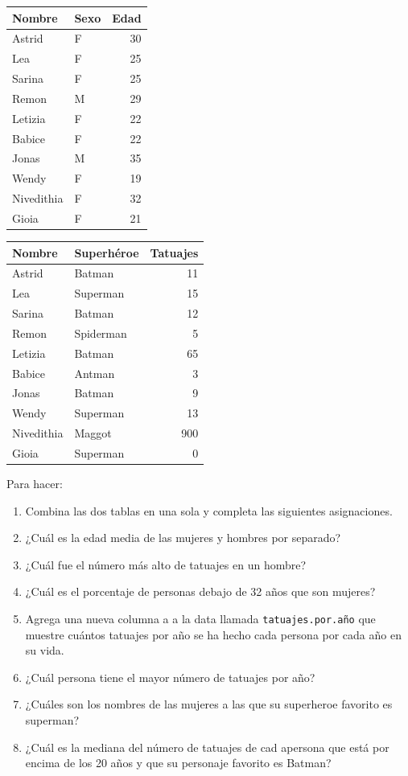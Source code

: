 \documentclass[
]{book}
\begin{document}
\begin{tabular}{l|l|r}
\hline
Nombre & Sexo & Edad\\
\hline
Astrid & F & 30\\
\hline
Lea & F & 25\\
\hline
Sarina & F & 25\\
\hline
Remon & M & 29\\
\hline
Letizia & F & 22\\
\hline
Babice & F & 22\\
\hline
Jonas & M & 35\\
\hline
Wendy & F & 19\\
\hline
Nivedithia & F & 32\\
\hline
Gioia & F & 21\\
\hline
\end{tabular}

\begin{tabular}{l|l|r}
\hline
Nombre & Superhéroe & Tatuajes\\
\hline
Astrid & Batman & 11\\
\hline
Lea & Superman & 15\\
\hline
Sarina & Batman & 12\\
\hline
Remon & Spiderman & 5\\
\hline
Letizia & Batman & 65\\
\hline
Babice & Antman & 3\\
\hline
Jonas & Batman & 9\\
\hline
Wendy & Superman & 13\\
\hline
Nivedithia & Maggot & 900\\
\hline
Gioia & Superman & 0\\
\hline
\end{tabular}

Para hacer:

\begin{enumerate}
\def\labelenumi{\arabic{enumi}.}
\item
  Combina las dos tablas en una sola y completa las siguientes asignaciones.
\item
  ¿Cuál es la edad media de las mujeres y hombres por separado?
\item
  ¿Cuál fue el número más alto de tatuajes en un hombre?
\item
  ¿Cuál es el porcentaje de personas debajo de 32 años que son mujeres?
\item
  Agrega una nueva columna a a la data llamada \texttt{tatuajes.por.año} que muestre cuántos tatuajes por año se ha hecho cada persona por cada año en su vida.
\item
  ¿Cuál persona tiene el mayor número de tatuajes por año?
\item
  ¿Cuáles son los nombres de las mujeres a las que su superheroe favorito es superman?
\item
  ¿Cuál es la mediana del número de tatuajes de cad apersona que está por encima de los 20 años y que su personaje favorito es Batman?\\
\end{enumerate}
\end{document}
